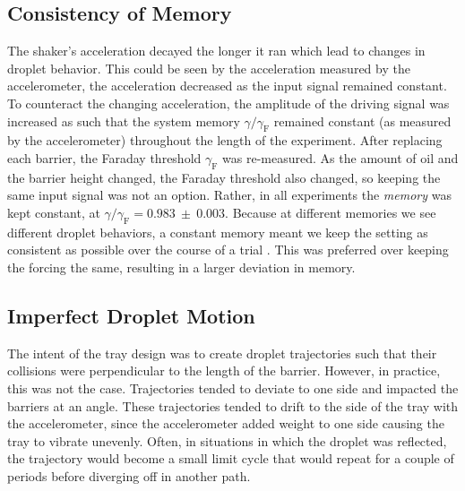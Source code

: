     \subsection{Consistency of Memory}
The shaker's acceleration decayed the longer it ran which lead to changes in droplet behavior. This could be seen by the acceleration measured by the accelerometer, the acceleration decreased as the input signal remained constant. To counteract the changing acceleration, the amplitude of the driving signal was increased as such that the system memory $\gamma/\gamma_\mathrm{F}$ remained constant (as measured by the accelerometer) throughout the length of the experiment. After replacing each barrier, the Faraday threshold $\gamma_\mathrm{F}$ was re-measured. As the amount of oil and the barrier height changed, the Faraday threshold also changed, so keeping the same input signal was not an option. Rather, in all experiments the \textit{memory} was kept constant, at $\gamma/\gamma_\mathrm{F} = \mathbf{0.983~\pm~0.003}$. Because at different memories we see different droplet behaviors, a constant memory meant we keep the setting as consistent as possible over the course of a trial . This was preferred over keeping the forcing the same, resulting in a larger deviation in memory. 

    \subsection{Imperfect Droplet Motion}
The intent of the tray design was to create droplet trajectories such that their collisions were perpendicular to the length of the barrier. However, in practice, this was not the case. Trajectories tended to deviate to one side and impacted the barriers at an angle. These trajectories tended to drift to the side of the tray with the accelerometer, since the accelerometer added weight to one side causing the tray to vibrate unevenly. Often, in situations in which the droplet was reflected, the trajectory would become a small limit cycle that would repeat for a couple of periods before diverging off in another path. 


